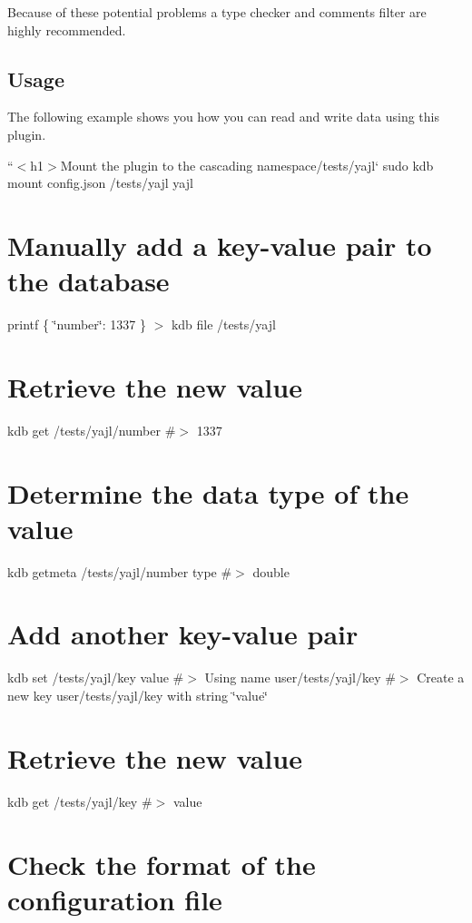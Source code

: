 Because of these potential problems a type checker and comments filter are highly recommended.

\subsection*{Usage}

The following example shows you how you can read and write data using this plugin.

``{\ttfamily  $<$h1$>$Mount the plugin to the cascading namespace}/tests/yajl` sudo kdb mount config.\+json /tests/yajl yajl

\section*{Manually add a key-\/value pair to the database}

printf \textquotesingle{}\{ \char`\"{}number\char`\"{}\+: 1337 \}\textquotesingle{} $>$ {\ttfamily kdb file /tests/yajl}

\section*{Retrieve the new value}

kdb get /tests/yajl/number \#$>$ 1337

\section*{Determine the data type of the value}

kdb getmeta /tests/yajl/number type \#$>$ double

\section*{Add another key-\/value pair}

kdb set /tests/yajl/key value \#$>$ Using name user/tests/yajl/key \#$>$ Create a new key user/tests/yajl/key with string \char`\"{}value\char`\"{}

\section*{Retrieve the new value}

kdb get /tests/yajl/key \#$>$ value

\section*{Check the format of the configuration file}

